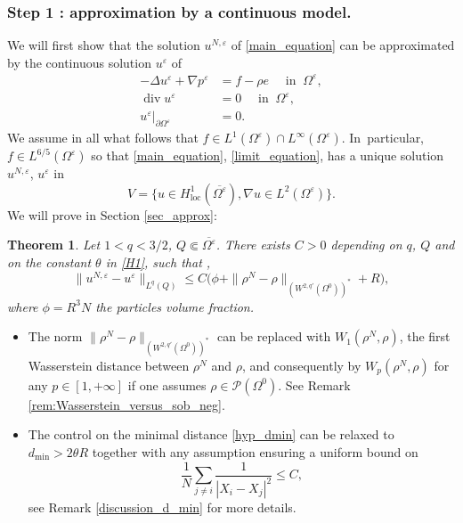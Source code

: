 \documentclass[JEP,XML,SOM,Unicode,NoEqCountersInSection,published]{cedram}
\newcommand{\loc}{\mathrm{loc}}
\renewcommand{\div}{\operatorname{div}}
\theoremstyle{plain}
\newtheorem{thm}{Theorem}[section]
\theoremstyle{definition}
\let\pa\partial
\let\na\nabla
\let\eps\varepsilon
\begin{document}
\subsubsection*{Step 1 : approximation by a continuous model.}
We will first show that the solution $u^{N,\eps}$ of \eqref{main_equation} can be approximated by the continuous solution $u^\eps$ of
\begin{equation} \label{limit_equation}
\begin{aligned}
-\Delta u^\eps + \na p^\eps & = f - \rho e \quad \text{ in } \: \Omega^\eps, \\
\div u^\eps & = 0 \quad \text{ in } \: \Omega^\eps, \\
u^\eps \vert_{\pa \Omega^\eps} & = 0.
\end{aligned}
\end{equation}
We assume in all what follows that $f \in L^1(\Omega^\eps) \cap L^\infty(\Omega^\eps)$. In~particular, $f \in L^{6/5}(\Omega^\eps)$ so that \eqref{main_equation}, \resp \eqref{limit_equation}, has a unique solution $u^{N,\eps}$, \resp $u^\eps$ in
\[
V = \{ u \in H^1_{\loc}(\overline{\Omega^\eps}), \na u \in L^2(\Omega^\eps)\}.
\]
We will prove in Section \ref{sec_approx}:
\begin{thm} \label{thm1}
Let $1<q<3/2$, $Q \Subset \overline{\Omega^\eps}$. There exists $C > 0$ depending on $q$, $Q$ and on the constant $\theta$ in \eqref{H1}, such that ,
\begin{equation} \label{first_estimate}
\|u^{N,\eps} - u^\eps\|_{L^q(Q)} \le C \big(\phi + \|\rho^N-\rho\|_{(W^{2,q'}(\Omega^0))^*}+R \big),
\end{equation}
where $\phi=R^3N$ the particles volume fraction.
\end{thm}
\begin{itemize}
\item The norm $\|\rho^N-\rho\|_{(W^{2,q'}(\Omega^0))^*}$ can be replaced with $W_1(\rho^N,\rho)$, the first Wasserstein distance between $\rho^N$ and $\rho$, and consequently by $W_p(\rho^N,\rho)$ for any $p\in[1,+\infty]$ if one assumes $\rho \in \mathcal{P}(\Omega^0)$. See Remark \ref{rem:Wasserstein_versus_sob_neg}.
\item The control on the minimal distance \eqref{hyp_dmin} can be relaxed to $d_{\min}>2 \theta R $ together with any assumption ensuring a uniform bound on
\[
\frac{1}{N} \sum_{j \neq i} \frac{1 }{|X_i-X_j|^2} \leq C,
\]
see Remark \ref{discussion_d_min} for more details.
\end{itemize}
\end{document}
